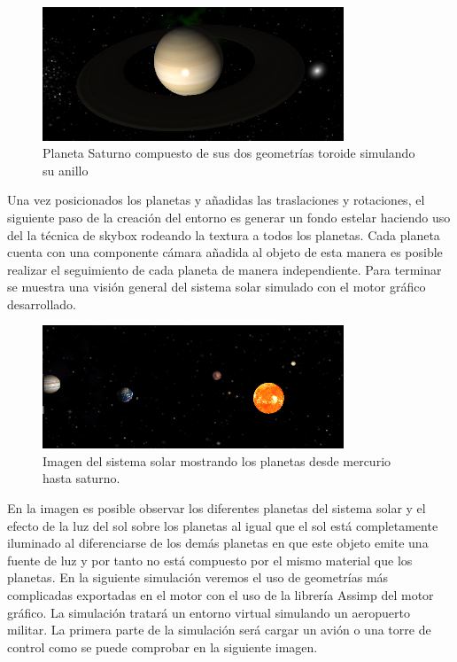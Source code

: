 \documentclass[a4paper]{book}
\begin{document}
\begin{figure}[H]
    \centering
    \includegraphics[width=9cm, keepaspectratio]{img/saturno.png}
    \caption{Planeta Saturno compuesto de sus dos geometrías toroide simulando su anillo}
    \label{saturno}
\end{figure}

Una vez posicionados los planetas y añadidas las traslaciones y rotaciones, el siguiente paso de la creación del entorno es generar
un fondo estelar haciendo uso del la técnica de skybox rodeando la textura a todos los planetas. Cada planeta cuenta con una
componente cámara añadida al objeto de esta manera es posible realizar el seguimiento de cada planeta de manera independiente.
Para terminar se muestra una visión general del sistema solar simulado con el motor gráfico desarrollado.

\begin{figure}[H]
    \centering
    \includegraphics[width=9cm, keepaspectratio]{img/SistemaSolar.png}
    \caption{Imagen del sistema solar mostrando los planetas desde mercurio hasta saturno.}
    \label{SistemaSolar}
\end{figure}

En la imagen es posible observar los diferentes planetas del sistema solar y el efecto de la luz del sol sobre los planetas al igual que
el sol está completamente iluminado al diferenciarse de los demás planetas en que este objeto emite una fuente de luz y por tanto no está
compuesto por el mismo material que los planetas. En la siguiente simulación veremos el uso de geometrías más complicadas exportadas
en el motor con el uso de la librería Assimp del motor gráfico. La simulación tratará un entorno virtual simulando un aeropuerto militar.
La primera parte de la simulación será cargar un avión o una torre de control como se puede comprobar en la siguiente imagen.
\end{document}
